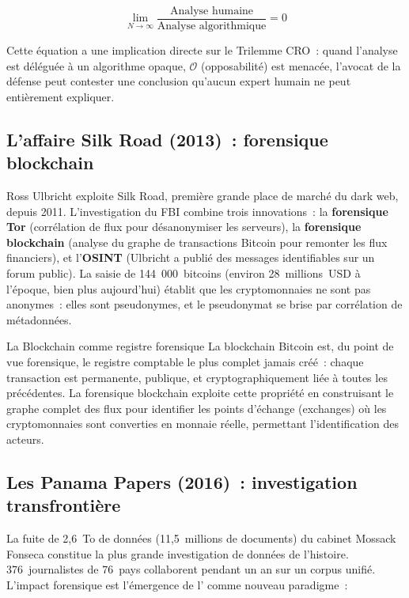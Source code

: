 \begin{equation}
\lim_{N \to \infty}
\frac{\text{Analyse humaine}}{\text{Analyse algorithmique}} = 0
\label{eq:bigdata}
\end{equation}

Cette équation a une implication directe sur le Trilemme CRO~: quand
l'analyse est déléguée à un algorithme opaque, $\mathcal{O}$ (opposabilité)
est menacée, l'avocat de la défense peut contester une conclusion
qu'aucun expert humain ne peut entièrement expliquer.

\subsection{L'affaire Silk Road (2013)~: forensique blockchain}

Ross Ulbricht exploite Silk Road, première grande place de marché du dark
web, depuis 2011. L'investigation du FBI combine trois innovations~: la
\textbf{forensique Tor} (corrélation de flux pour désanonymiser les serveurs),
la \textbf{forensique blockchain} (analyse du graphe de transactions Bitcoin
pour remonter les flux financiers), et l'\textbf{OSINT} (Ulbricht a publié
des messages identifiables sur un forum public). La saisie de 144~000~bitcoins
(environ 28~millions~USD à l'époque, bien plus aujourd'hui) établit que
les cryptomonnaies ne sont pas anonymes~: elles sont pseudonymes, et le
pseudonymat se brise par corrélation de métadonnées.

\begin{boiteRemarque}{La Blockchain comme registre forensique}
La blockchain Bitcoin est, du point de vue forensique, le registre comptable
le plus complet jamais créé~: chaque transaction est permanente, publique,
et cryptographiquement liée à toutes les précédentes. La forensique blockchain
exploite cette propriété en construisant le graphe complet des flux pour
identifier les points d'échange (exchanges) où les cryptomonnaies sont
converties en monnaie réelle, permettant l'identification des acteurs.
\end{boiteRemarque}

\subsection{Les Panama Papers (2016)~: investigation transfrontière}

La fuite de 2,6~To de données (11,5~millions de documents) du cabinet
Mossack Fonseca constitue la plus grande investigation de données de
l'histoire. 376~journalistes de 76~pays collaborent pendant un an
sur un corpus unifié. L'impact forensique est l'émergence de
l'
comme nouveau paradigme~:

